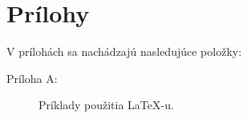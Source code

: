 \chapter*{Prílohy}
V prílohách sa nachádzajú nasledujúce položky:
\begin{description}
	\item [Príloha A:] Príklady použitia \LaTeX -u.
\end{description}

\appendix
\renewcommand\appendixname{Príloha}

%
